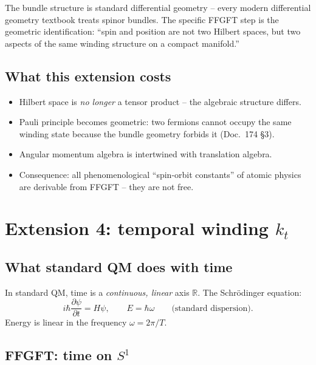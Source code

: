 The bundle structure is standard differential geometry -- every
modern differential geometry textbook treats spinor bundles. The
specific FFGFT step is the geometric identification:
\enquote{spin and position are not two Hilbert spaces, but two
aspects of the same winding structure on a compact manifold.}

\subsection{What this extension costs}

\begin{itemize}[leftmargin=2em,itemsep=2pt,topsep=2pt]
  \item Hilbert space is \emph{no longer} a tensor product -- the
        algebraic structure differs.
  \item Pauli principle becomes geometric: two fermions cannot
        occupy the same winding state because the bundle geometry
        forbids it (Doc.~174 §3).
  \item Angular momentum algebra is intertwined with translation
        algebra.
  \item Consequence: all phenomenological \enquote{spin-orbit
        constants} of atomic physics are derivable from FFGFT -- they
        are not free.
\end{itemize}

\section{\texorpdfstring{Extension 4: temporal winding $k_t$}{Extension 4: temporal winding k_t}}

\subsection{What standard QM does with time}

In standard QM, time is a \emph{continuous, linear} axis $\mathbb{R}$.
The Schrödinger equation:
\begin{equation}
  i\hbar \frac{\partial \psi}{\partial t} = H \psi,
  \qquad
  E = \hbar \omega
  \qquad \text{(standard dispersion)}.
\end{equation}
Energy is linear in the frequency $\omega = 2\pi/T$.

\subsection{FFGFT: time on $S^1$}


